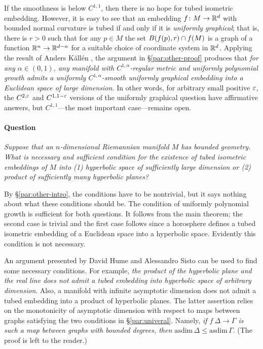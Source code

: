 \arxiv{\documentclass[a4paper,10pt]{article}}{\documentclass{mjm}}
\begin{document}
If the smoothness is below $C^{1,1}$, then there is no hope for tubed isometric embedding.
However, it is easy to see that an embedding $f\colon M\to \mathbb{R}^d$ with bounded normal curvature is tubed if and only if it is \emph{uniformly graphical};
that is, there is $r>0$ such that for any $p\in M$ the set $B(f(p),r)\z\cap f(M)$ is a graph of a function $\mathbb{R}^n\to \mathbb{R}^{d-n}$ for a suitable choice of coordinate system in $\mathbb{R}^d$.
Applying the result of Anders K\"{a}ll\'{e}n \cite{kallen}, the argument in §\ref{par:other-proof} produces that 
\textit{for any $\alpha\in(0,1)$, any manifold with $C^{1,\alpha}$-regular metric and uniformly polynomial growth admits a  uniformly $C^{1,\alpha}$-smooth uniformly graphical embedding into a Euclidean space of large dimension.}
In other words, for arbitrary small positive $\varepsilon$, the $C^{2,\varepsilon}$ and $C^{1,1-\varepsilon}$ versions of the uniformly graphical question have affirmative answers, but $C^{1,1}$---the most important case---remains open.

\paragraph{Question}\label{par:Hn+H2n}
\textit{Suppose that an $n$-dimensional Riemannian manifold $M$ has bounded geometry.
What is necessary and sufficient condition for the existence of tubed isometric embeddings of $M$
into (1) hyperbolic space of sufficiently large dimension or (2) product of sufficiently many hyperbolic planes?}

\medskip

By §\ref{par:other-intro}, the conditions have to be nontrivial, 
but it says nothing about what these conditions should be.
The condition of uniformly polynomial growth is sufficient for both questions.
It follows from the main theorem; the second case is trivial and the first case follows 
since a horosphere defines a tubed isometric embedding of a Euclidean space into a hyperbolic space.
Evidently this condition is not necessary.

An argument presented by David Hume and Alessandro Sisto \cite[1.1]{hume-sisto} can be used to find some necessary conditions. For example, \textit{the product of the hyperbolic plane and the real line does not admit a tubed embedding into hyperbolic space of arbitrary dimension}.
Also, a manifold with infinite asymptotic dimension does not admit a tubed embedding into a product of hyperbolic planes.
The latter assertion relies on the monotonicity of asymptotic dimension with respect to maps between graphs satisfying the two conditions in §\ref{par:univeral}.
Namely, \textit{if $f\:\Delta\to \Gamma$ is such a map between graphs with bounded degrees, then $\mathrm{asdim}\,\Delta\le \mathrm{asdim}\,\Gamma$}.
(The proof is left to the reader.)
\end{document}
